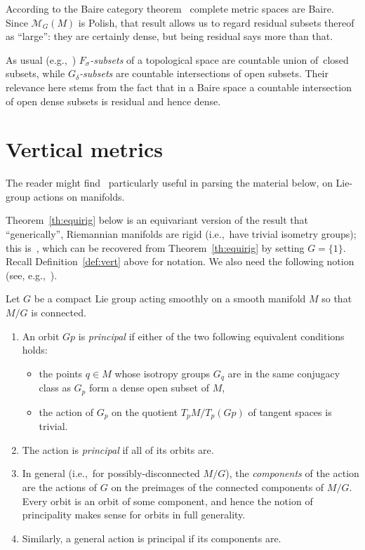 \documentclass[10pt,a4paper]{amsart}
\numberwithin{equation}{section}
\begin{document}
According to the Baire category theorem~\cite[Theorem~11.7.2]{nb} complete metric spaces are Baire. Since $\mathcal{M}_G(M)$ is Polish, that result allows us to regard residual subsets thereof as ``large'': they are certainly dense, but being residual says more than that.

As usual (e.g.,~\cite[Section~1.3]{eng-top}) {\it $F_{\sigma}$-subsets} of a topological space are countable union of~clo\-sed subsets, while {\it $G_{\delta}$-subsets} are countable intersections of open subsets. Their relevance here stems from the fact that in a Baire space a countable intersection of open dense subsets is residual and hence dense.

\section{Vertical metrics}\label{se:vert}

The reader might find~\cite{mb-gps,bred-gps,kob-gps} particularly useful in parsing the material below, on Lie-group actions on manifolds.

Theorem~\ref{th:equirig} below is an equivariant version of the result that ``generically'', Riemannian manifolds are rigid (i.e.,~have trivial isometry groups); this is~\cite[Proposition~8.3]{eb}, which can be recovered from Theorem~\ref{th:equirig} by setting $G=\{1\}$. Recall Definition~\ref{def:vert} above for notation. We also need the following notion (see, e.g.,~\cite[Proposition~I.2.5 and the discussion following it, and Remark I.2.7]{aud}).

\begin{Definition}\label{def:princ}
 Let $G$ be a compact Lie group acting smoothly on a smooth manifold $M$ so that $M/G$ is connected.
 \begin{enumerate}[($a$)]\itemsep=0pt
 \item An orbit $Gp$ is {\it principal} if either of the two following equivalent conditions holds:
 \begin{itemize}\itemsep=0pt
 \item the points $q\in M$ whose isotropy groups $G_q$ are in the same conjugacy class as $G_p$ form a dense open subset of $M$,
 \item the action of $G_p$ on the quotient $T_pM/T_p(Gp)$ of tangent spaces is trivial.
 \end{itemize}
 \item The action is {\it principal} if all of its orbits are.
 \item In general (i.e.,~for possibly-disconnected $M/G$), the {\it components} of the action are the actions of $G$ on the preimages of the connected components of $M/G$. Every orbit is an orbit of some component, and hence the notion of principality makes sense for orbits in full generality.
 \item Similarly, a general action is principal if its components are.
 \end{enumerate}
\end{Definition}
\end{document}
